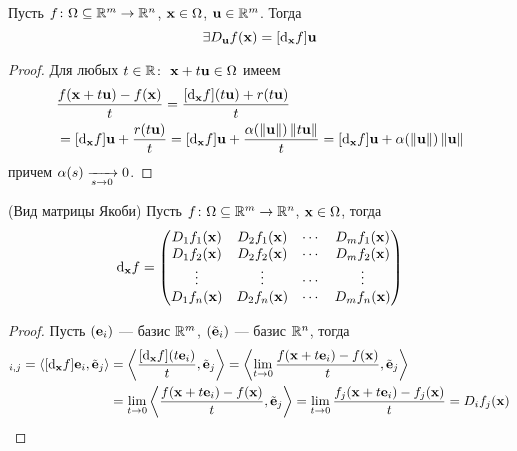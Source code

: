 \begin{proposition}
    Пусть $f \colon \O \subseteq \Rm \to \Rn$, $\x \in \O$, $\elemvec{u} \in
    \Rm$. Тогда
\[
    \exists \dder{f}{\x}{\elemvec{u}} = [\der{f}{\x}]\elemvec{u}
\]
\end{proposition}
\begin{proof} Для любых $t \in \R\colon~ \x + t\elemvec{u} \in \O$ имеем
\begin{align*}
    &\frac{f(\x + t\elemvec{u}) - f(\x)}{t} =
    \frac{[\der{f}{\x}](t\elemvec{u}) + r(t\elemvec{u})}{t} \\
    &= [\der{f}{\x}]\elemvec{u} +
	\frac{r(t\elemvec{u})}{t} = [\der{f}{\x}]\elemvec{u} +
	\frac{\a(\norm{\eu})\norm{t\elemvec{u}}}{t} =
	[\der{f}{\x}]\elemvec{u} + \a(\norm{\eu})\norm{\elemvec{u}}
\end{align*}
	причем $\a(s) \xrightarrow[s \to 0]{} 0$.
\end{proof}

\begin{theorem}(Вид матрицы Якоби)
    Пусть $f \colon \O \subseteq \Rm \to \Rn$, $\x \in \O$, тогда
\[
    \der{f}{\x} = \begin{pmatrix}
                    \dder{f_1}{\x}{1} & \dder{f_1}{\x}{2} & \cdots &
                    \dder{f_1}{\x}{m} \\
                    \dder{f_2}{\x}{1} & \dder{f_2}{\x}{2} & \cdots &
                    \dder{f_2}{\x}{m} \\
                    \vdots & \vdots & \cdots & \vdots \\
                    \dder{f_n}{\x}{1} & \dder{f_n}{\x}{2} & \cdots &
                    \dder{f_n}{\x}{m}
                  \end{pmatrix}
\]
\end{theorem}
\begin{proof}
    Пусть $(\elemvec{e}_i)$ --- базис $\Rm$, $(\tilde{\elemvec{e}}_i)$ --- базис
    $\Rn$, тогда
\begin{align*}
    [\der{f}{\x}]_{i, j} = \langle [\der{f}{\x}]\elemvec{e}_i,
    \tilde{\elemvec{e}}_j \rangle
    &= \left\langle \frac{[\der{f}{\x}](t\elemvec{e}_i)}{t},
    \tilde{\elemvec{e}}_j \right\rangle
    = \left\langle \lim_{t \to 0}{\frac{f(\x + t\elemvec{e}_i) - f(\x)}{t}},
    \tilde{\elemvec{e}}_j \right\rangle \\
    &= \lim_{t \to 0}{\left\langle \frac{f(\x + t\elemvec{e}_i) - f(\x)}{t},
    \tilde{\elemvec{e}}_j \right\rangle}
    = \lim_{t \to 0}{\frac{f_j(\x + t\elemvec{e}_i) - f_j(\x)}{t}}
    = \dder{f_j}{\x}{i}
\end{align*}
\end{proof}


